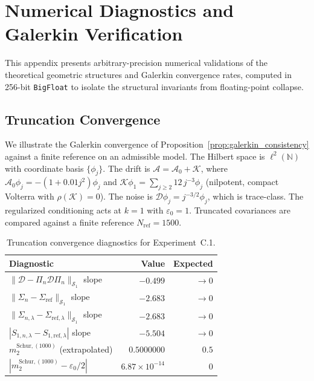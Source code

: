 \section{Numerical Diagnostics and Galerkin Verification}
\label{app:experiments}

This appendix presents arbitrary-precision numerical validations of the theoretical geometric structures and Galerkin convergence rates, computed in 256-bit \texttt{BigFloat} to isolate the structural invariants from floating-point collapse.

\subsection{Truncation Convergence}
\label{app:experiments:truncation}

We illustrate the Galerkin convergence of Proposition~\ref{prop:galerkin_consistency} against a finite reference on an admissible model. The Hilbert space is $\ell^2(\mathbb{N})$ with coordinate basis $\{\phi_j\}$. The drift is $\mathcal{A} = \mathcal{A}_0 + \mathcal{K}$, where $\mathcal{A}_0 \phi_j = -(1 + 0.01 j^2)\phi_j$ and $\mathcal{K}\phi_1 = \sum_{j \ge 2} 12\,j^{-3}\phi_j$ (nilpotent, compact Volterra with $\rho(\mathcal{K})=0$). The noise is $\mathcal{D}\phi_j = j^{-3/2}\phi_j$, which is trace-class. The regularized conditioning acts at $k=1$ with $\varepsilon_0 = 1$. Truncated covariances are compared against a finite reference $N_{\text{ref}} = 1500$.

\begin{table}[h]
  \centering
  \caption{Truncation convergence diagnostics for Experiment~C.1.}
  \label{tab:truncation}
  \begin{tabular}{lrr}
    \toprule
    Diagnostic & Value & Expected \\
    \midrule
    $\|\mathcal{D} - \Pi_n \mathcal{D} \Pi_n\|_{\mathcal{S}_1}$ slope & $-0.499$ & $\to 0$ \\
    $\|\Sigma_n - \Sigma_{\text{ref}}\|_{\mathcal{S}_1}$ slope & $-2.683$ & $\to 0$ \\
    $\|\Sigma_{n,\lambda} - \Sigma_{\text{ref},\lambda}\|_{\mathcal{S}_1}$ slope & $-2.683$ & $\to 0$ \\
    $|S_{1,n,\lambda} - S_{1,\text{ref},\lambda}|$ slope & $-5.504$ & $\to 0$ \\
    $m_2^{\mathrm{Schur},(1000)}$ (extrapolated) & $0.5000000$ & $0.5$ \\
    $|m_2^{\mathrm{Schur},(1000)} - \varepsilon_0/2|$ & $6.87 \times 10^{-14}$ & $0$ \\
    \bottomrule
  \end{tabular}
\end{table}


